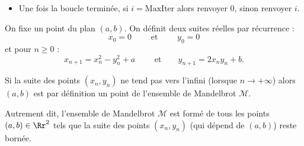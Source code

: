 \documentclass[11pt,class=report,crop=false]{standalone}
\begin{document}
\begin{activite}
\begin{enumerate}
\begin{algorithme}
\begin{itemize}
   \item Une fois la boucle terminée, si $i =\text{MaxIter}$ alors renvoyer $0$, sinon renvoyer $i$.
   
 \end{itemize}  
 \end{algorithme}
  
\end{enumerate} 


\end{activite}




\begin{cours}



On fixe un point du plan $(a,b)$. On définit deux suites réelles par récurrence :
$$x_0= 0 \qquad \text{ et } \qquad y_0 = 0$$
et pour $n\ge0$ :
$$x_{n+1} = x_n^2 - y_n^2 + a \qquad \text{ et} \qquad y_{n+1} = 2 x_n y_n+ b.$$

Si la suite des points $(x_n,y_n)$ ne tend pas vers l'infini (lorsque $n \to +\infty$) alors $(a,b)$ est par définition un point de l'ensemble de Mandelbrot $\mathcal{M}$.

Autrement dit, l'ensemble de Mandelbrot $\mathcal{M}$ est formé de tous les points $(a,b) \in \Rr^2$ tels que la suite des points $(x_n,y_n)$ (qui dépend de $(a,b)$) reste bornée.
\end{cours}




\end{document}
